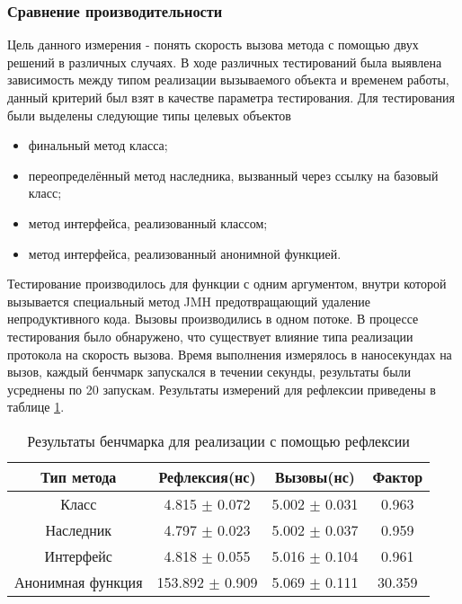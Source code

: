 \subsubsection{Сравнение производительности}
Цель данного измерения - понять скорость вызова метода с помощью двух решений в различных случаях. В ходе различных тестирований была выявлена зависимость между типом реализации вызываемого объекта и временем работы, данный критерий был взят в качестве параметра тестирования. Для тестирования были выделены следующие типы целевых объектов
\begin{itemize}
  \item финальный метод класса;
  \item переопределённый метод наследника, вызванный через ссылку на базовый класс;
  \item метод интерфейса, реализованный классом;
  \item метод интерфейса, реализованный анонимной функцией.
\end{itemize}

Тестирование производилось для функции с одним аргументом, внутри которой вызывается специальный метод JMH\cite{jmh} предотвращающий удаление непродуктивного кода. Вызовы производились в одном потоке. В процессе тестирования было обнаружено, что существует влияние типа реализации протокола на скорость вызова. Время выполнения измерялось в наносекундах на вызов, каждый бенчмарк запускался в течении секунды, результаты были усреднены по 20 запускам. Результаты измерений для рефлексии приведены в таблице \ref{benchmark:prototype}.
\begin{table}
\begin{center}
\begin{tabular}{|c|c|c|c|} \hline
Тип метода & Рефлексия(нс) &  Вызовы(нс) & Фактор \\ \hline
Класс & 4.815 $\pm$ 0.072 & 5.002 $\pm$ 0.031 & 0.963 \\ \hline
Наследник & 4.797 $\pm$ 0.023 & 5.002 $\pm$ 0.037 & 0.959 \\ \hline
Интерфейс & 4.818 $\pm$ 0.055 & 5.016 $\pm$ 0.104 & 0.961 \\ \hline
Анонимная функция & 153.892 $\pm$ 0.909 & 5.069 $\pm$ 0.111 & 30.359 \\ \hline
\end{tabular}
\caption{Результаты бенчмарка для реализации с помощью рефлексии}
\label{benchmark:prototype}
\end{center}
\end{table}

